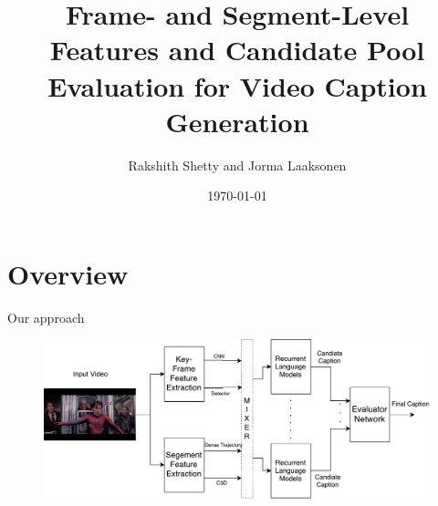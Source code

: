 \documentclass{beamer}
\begin{document}

\title{Frame- and Segment-Level Features and Candidate Pool Evaluation for Video Caption Generation}

\author[Rakshith Shetty and Jorma Laaksonen]{Rakshith Shetty and Jorma Laaksonen}
\date{\today}

\frame{\titlepage} 


\section{Overview}
\begin{frame}{Our approach}
\begin{figure}[h]
    \centering
    \includegraphics[width=1.0\textwidth]{images/MMGC_Overview.pdf}
\end{figure}
\end{frame}
\end{document}
